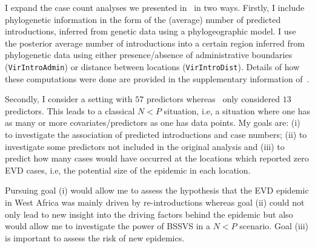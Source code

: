I expand the case count analyses we presented in~\cite{Dudas2017} in two ways.
Firstly, I include phylogenetic information in the form of the (average) number of predicted introductions, inferred from genetic data using a phylogeographic model.
I use the posterior average number of introductions into a certain region inferred from phylogenetic data using either presence/absence of administrative boundaries (\verb|VirIntroAdmin|) or distance  between locations (\verb|VirIntroDist|).
Details of how these computations were done are provided in the supplementary information of~\cite{Dudas2017}.


Secondly, I consider a setting with $57$ predictors whereas~\cite{Dudas2017} only considered $13$ predictors.
This leads to a classical $N < P$ situation, i.e,  a situation where one has as many  or more covariates/predictors as one has data points.
My goals are: (i) to investigate the association of predicted introductions and case numbers; (ii) to investigate some predictors not included in the original analysis and (iii) to predict how many cases would have occurred at the locations which reported zero EVD cases, i.e, the potential size of the epidemic in each location.

Pursuing goal (i) would allow me to assess the hypothesis that the EVD epidemic in West Africa was mainly driven by re-introductions whereas goal (ii) could not only lead to new insight into the driving factors behind the epidemic but also would allow me to investigate the power of BSSVS in a $N<P$ scenario.
Goal (iii) is important to assess the risk of new epidemics.

